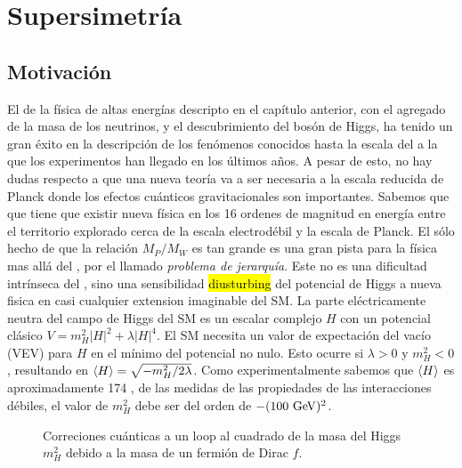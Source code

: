 \chapter{Supersimetría}


\section{Motivación}

El {\SM} de la física de altas energías descripto en el capítulo anterior,
con el agregado de la masa de los neutrinos, y el descubrimiento del bosón
de Higgs, ha tenido un gran éxito en la descripción de los fenómenos
conocidos hasta la escala del {\tev} a la que los experimentos han llegado
en los últimos a\~nos.
A pesar de esto, no hay dudas respecto a que una nueva teor\'ia va a ser
necesaria a la escala reducida de Planck %
donde los efectos cu\'anticos gravitacionales son importantes. Sabemos que
que tiene que existir nueva f\'isica en los 16 ordenes de magnitud en
energ\'ia entre el territorio explorado cerca de la escala electrod\'ebil
y la escala de Planck.
El s\'olo hecho de que la relación $M_P/M_W$ es tan grande es una gran pista
para la física mas allá del {\SM}, por el llamado \emph{problema de jerarquía}.
Este no es una dificultad intrínseca del {\SM}, sino una sensibilidad \hl{diusturbing}
del potencial de Higgs a nueva fisica en casi cualquier extension imaginable
del SM.
La parte eléctricamente neutra del campo de Higgs del SM es un escalar complejo
$H$ con un potencial clásico $V=m_H^2 |H|^2 + \lambda|H|^4$.
El SM necesita un valor de expectación del vacío (VEV) para $H$ en el
mínimo del potencial no nulo.
Esto ocurre si $\lambda>0$ y $m_H^2<0$, resultando en
$\langle H \rangle = \sqrt{-m_H^2/2\lambda}$.
Como experimentalmente sabemos que $\langle H \rangle$ es aproximadamente 174 \gev,
de las medidas de las propiedades de las interacciones débiles, el valor de
$m_H^2$ debe ser del orden de $-(100 \gev)^2$.

\begin{figure}[h]
  \centering
  
  \caption{Correciones cu\'anticas a un loop al cuadrado de la masa del Higgs
    $m_H^2$ debido a la masa de un fermi\'on de Dirac $f$.}
  \label{fig:higgs_correction_f}
\end{figure}


